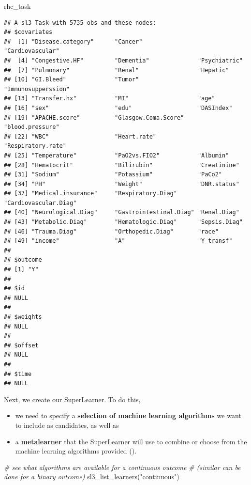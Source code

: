 \documentclass[
]{book}
\newenvironment{Shaded}{\begin{snugshade}}{\end{snugshade}}
\newcommand{\CommentTok}[1]{\textcolor[rgb]{0.56,0.35,0.01}{\textit{#1}}}
\newcommand{\FunctionTok}[1]{\textcolor[rgb]{0.00,0.00,0.00}{#1}}
\newcommand{\NormalTok}[1]{#1}
\newcommand{\StringTok}[1]{\textcolor[rgb]{0.31,0.60,0.02}{#1}}
\providecommand{\tightlist}{%
  \setlength{\itemsep}{0pt}\setlength{\parskip}{0pt}}
\begin{document}
\begin{Shaded}
\begin{Highlighting}[]
\NormalTok{rhc\_task}
\end{Highlighting}
\end{Shaded}

\begin{verbatim}
## A sl3 Task with 5735 obs and these nodes:
## $covariates
##  [1] "Disease.category"      "Cancer"                "Cardiovascular"       
##  [4] "Congestive.HF"         "Dementia"              "Psychiatric"          
##  [7] "Pulmonary"             "Renal"                 "Hepatic"              
## [10] "GI.Bleed"              "Tumor"                 "Immunosupperssion"    
## [13] "Transfer.hx"           "MI"                    "age"                  
## [16] "sex"                   "edu"                   "DASIndex"             
## [19] "APACHE.score"          "Glasgow.Coma.Score"    "blood.pressure"       
## [22] "WBC"                   "Heart.rate"            "Respiratory.rate"     
## [25] "Temperature"           "PaO2vs.FIO2"           "Albumin"              
## [28] "Hematocrit"            "Bilirubin"             "Creatinine"           
## [31] "Sodium"                "Potassium"             "PaCo2"                
## [34] "PH"                    "Weight"                "DNR.status"           
## [37] "Medical.insurance"     "Respiratory.Diag"      "Cardiovascular.Diag"  
## [40] "Neurological.Diag"     "Gastrointestinal.Diag" "Renal.Diag"           
## [43] "Metabolic.Diag"        "Hematologic.Diag"      "Sepsis.Diag"          
## [46] "Trauma.Diag"           "Orthopedic.Diag"       "race"                 
## [49] "income"                "A"                     "Y_transf"             
## 
## $outcome
## [1] "Y"
## 
## $id
## NULL
## 
## $weights
## NULL
## 
## $offset
## NULL
## 
## $time
## NULL
\end{verbatim}

Next, we create our SuperLearner. To do this,

\begin{itemize}
\tightlist
\item
  we need to specify a \textbf{selection of machine learning algorithms} we want to include as candidates, as well as
\item
  a \textbf{metalearner} that the SuperLearner will use to combine or choose from the machine learning algorithms provided (\citet{coyle2021tlverse}).
\end{itemize}

\begin{Shaded}
\begin{Highlighting}[]
\CommentTok{\# see what algorithms are available for a continuous outcome }
\CommentTok{\# (similar can be done for a binary outcome)}
\FunctionTok{sl3\_list\_learners}\NormalTok{(}\StringTok{"continuous"}\NormalTok{)}
\end{Highlighting}
\end{Shaded}
\end{document}
